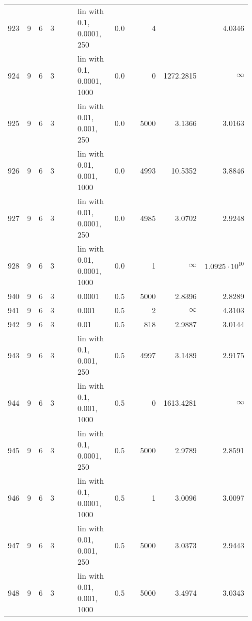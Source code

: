 \begin{longtable}{lrrrrrlrrrrr}
  923 &       9 & 6 & 3 &   &   &   lin with 0.1, 0.0001, 250 &      0.0 &        &       4 &                        &                 4.0346 \\
  924 &       9 & 6 & 3 &   &   &  lin with 0.1, 0.0001, 1000 &      0.0 &        &       0 &              1272.2815 &               $\infty$ \\
  925 &       9 & 6 & 3 &   &   &   lin with 0.01, 0.001, 250 &      0.0 &        &    5000 &                 3.1366 &                 3.0163 \\
  926 &       9 & 6 & 3 &   &   &  lin with 0.01, 0.001, 1000 &      0.0 &        &    4993 &                10.5352 &                 3.8846 \\
  927 &       9 & 6 & 3 &   &   &  lin with 0.01, 0.0001, 250 &      0.0 &        &    4985 &                 3.0702 &                 2.9248 \\
  928 &       9 & 6 & 3 &   &   & lin with 0.01, 0.0001, 1000 &      0.0 &        &       1 &               $\infty$ &  $1.0925\cdot 10^{10}$ \\
  940 &       9 & 6 & 3 &   &   &                      0.0001 &      0.5 &        &    5000 &                 2.8396 &                 2.8289 \\
  941 &       9 & 6 & 3 &   &   &                       0.001 &      0.5 &        &       2 &               $\infty$ &                 4.3103 \\
  942 &       9 & 6 & 3 &   &   &                        0.01 &      0.5 &        &     818 &                 2.9887 &                 3.0144 \\
  943 &       9 & 6 & 3 &   &   &    lin with 0.1, 0.001, 250 &      0.5 &        &    4997 &                 3.1489 &                 2.9175 \\
  944 &       9 & 6 & 3 &   &   &   lin with 0.1, 0.001, 1000 &      0.5 &        &       0 &              1613.4281 &               $\infty$ \\
  945 &       9 & 6 & 3 &   &   &   lin with 0.1, 0.0001, 250 &      0.5 &        &    5000 &                 2.9789 &                 2.8591 \\
  946 &       9 & 6 & 3 &   &   &  lin with 0.1, 0.0001, 1000 &      0.5 &        &       1 &                 3.0096 &                 3.0097 \\
  947 &       9 & 6 & 3 &   &   &   lin with 0.01, 0.001, 250 &      0.5 &        &    5000 &                 3.0373 &                 2.9443 \\
  948 &       9 & 6 & 3 &   &   &  lin with 0.01, 0.001, 1000 &      0.5 &        &    5000 &                 3.4974 &                 3.0343 \\

\end{longtable}
